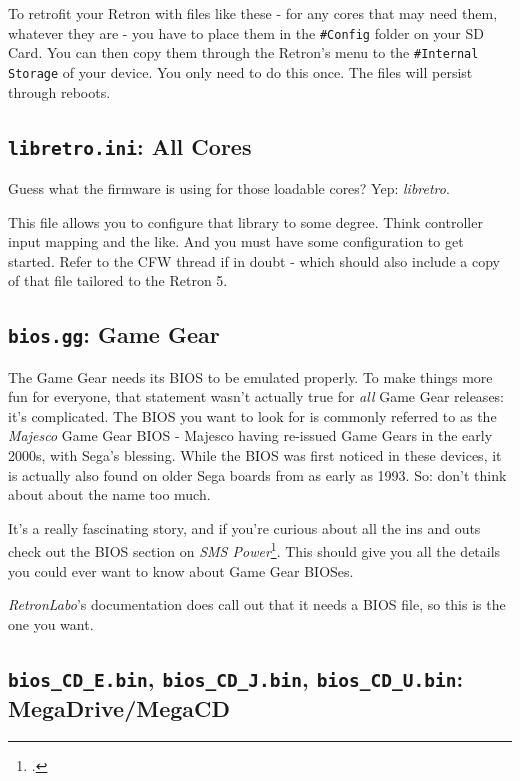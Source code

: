 \documentclass[a4paper]{article}
\begin{document}
To retrofit your Retron with files like these - for any cores that may need them, whatever they are - you have to place them in the \texttt{\#Config} folder on your SD Card. You can then copy them through the Retron's menu to the \texttt{\#Internal Storage} of your device. You only need to do this once. The files will persist through reboots.

\clearpage

\subsection{\texttt{libretro.ini}: All Cores}

Guess what the firmware is using for those loadable cores? Yep: \emph{libretro}.

This file allows you to configure that library to some degree. Think controller input mapping and the like. And you must have some configuration to get started. Refer to the CFW thread if in doubt - which should also include a copy of that file tailored to the Retron 5.

\subsection{\texttt{bios.gg}: Game Gear}

The Game Gear needs its BIOS to be emulated properly. To make things more fun for everyone, that statement wasn't actually true for \emph{all} Game Gear releases: it's complicated. The BIOS you want to look for is commonly referred to as the \emph{Majesco} Game Gear BIOS - Majesco having re-issued Game Gears in the early 2000s, with Sega's blessing. While the BIOS was first noticed in these devices, it is actually also found on older Sega boards from as early as 1993. So: don't think about about the name too much.

It's a really fascinating story, and if you're curious about all the ins and outs check out the BIOS section on \emph{SMS Power}\footcite{ref:smsp-bios}. This should give you all the details you could ever want to know about Game Gear BIOSes.

\emph{RetronLabo}'s documentation does call out that it needs a BIOS file, so this is the one you want.

\subsection{\texttt{bios\_CD\_E.bin}, \texttt{bios\_CD\_J.bin}, \texttt{bios\_CD\_U.bin}: MegaDrive/MegaCD}
\end{document}
